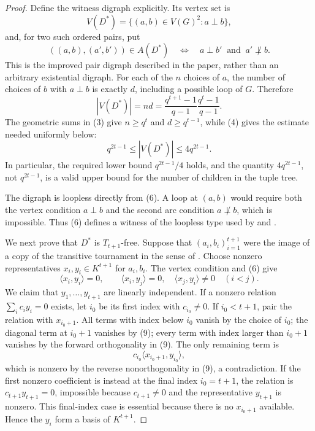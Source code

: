\begin{proof}
Define the witness digraph explicitly.  Its vertex set is
\[
 V(D^*)=\{(a,b)\in V(G)^2:a\perp b\},
\]
and, for two such ordered pairs, put
\[
 ((a,b),(a',b'))\in A(D^*)\quad\Longleftrightarrow\quad
 a\perp b'\ \text{ and }\ a'\not\perp b.                    \tag{6}
\]
This is the improved pair digraph described in the paper, rather than an
arbitrary existential digraph.  For each of the $n$ choices of $a$, the
number of choices of $b$ with $a\perp b$ is exactly $d$, including a
possible loop of $G$.  Therefore
\[
 |V(D^*)|=nd
 =\frac{q^{t+1}-1}{q-1}\frac{q^t-1}{q-1}.                    \tag{7}
\]
The geometric sums in (3) give $n\geq q^t$ and $d\geq q^{t-1}$, while
(4) gives the estimate needed uniformly below:
\[
 q^{2t-1}\leq |V(D^*)|\leq4q^{2t-1}.                         \tag{8}
\]
In particular, the required lower bound $q^{2t-1}/4$ holds, and the
quantity $4q^{2t-1}$, not $q^{2t-1}$, is a valid upper bound for the number
of children in the tuple tree.

The digraph is loopless directly from (6).  A loop at $(a,b)$ would require
both the vertex condition $a\perp b$ and the second arc condition
$a\not\perp b$, which is impossible.  Thus (6) defines a witness of the
loopless type used by  and
.

We next prove that $D^*$ is $T_{t+1}$-free.  Suppose that
$(a_i,b_i)_{i=1}^{t+1}$ were the image of a copy of the transitive
tournament in the sense of .  Choose nonzero
representatives $x_i,y_i\in K^{t+1}$ for $a_i,b_i$.  The vertex condition
and (6) give
\[
 \langle x_i,y_i\rangle=0,\qquad
 \langle x_i,y_j\rangle=0,
 \quad\langle x_j,y_i\rangle\neq0 \quad(i<j).                \tag{9}
\]
We claim that $y_1,\ldots,y_{t+1}$ are linearly independent.  If a nonzero
relation $\sum_i c_i y_i=0$ exists, let $i_0$ be its first index with
$c_{i_0}\neq0$.  If $i_0<t+1$, pair the relation with $x_{i_0+1}$.  All
terms with index below $i_0$ vanish by the choice of $i_0$; the diagonal
term at $i_0+1$ vanishes by (9); every term with index larger than
$i_0+1$ vanishes by the forward orthogonality in (9).  The only remaining
term is
\[
 c_{i_0}\langle x_{i_0+1},y_{i_0}\rangle,
\]
which is nonzero by the reverse nonorthogonality in (9), a contradiction.
If the first nonzero coefficient is instead at the final index $i_0=t+1$,
the relation is $c_{t+1}y_{t+1}=0$, impossible because
$c_{t+1}\neq0$ and the representative $y_{t+1}$ is nonzero.  This final-index
case is essential because there is no $x_{i_0+1}$ available.  Hence the
$y_i$ form a basis of $K^{t+1}$.


\end{proof}
